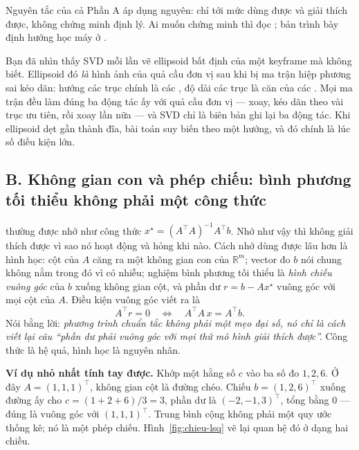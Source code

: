 \documentclass[../../../deep_learning.tex]{subfiles}
\begin{document}
Nguyên tắc của cả Phần A áp dụng nguyên: chỉ tới mức dùng được và giải thích được, không chứng minh định lý. Ai muốn chứng minh thì đọc \cite{trefethen1997}; bản trình bày định hướng học máy ở \cite{deisenroth2020}.

\begin{trucgiac}
Bạn đã nhìn thấy SVD mỗi lần vẽ ellipsoid bất định của một keyframe mà không biết. Ellipsoid đó \emph{là} hình ảnh của quả cầu đơn vị sau khi bị ma trận hiệp phương sai kéo dãn: hướng các trục chính là các , độ dài các trục là căn của các . Mọi ma trận đều làm đúng ba động tác ấy với quả cầu đơn vị --- xoay, kéo dãn theo vài trục ưu tiên, rồi xoay lần nữa --- và SVD chỉ là biên bản ghi lại ba động tác. Khi ellipsoid dẹt gần thành đĩa, bài toán suy biến theo một hướng, và đó chính là lúc số điều kiện lớn.
\end{trucgiac}

\subsection{B. Không gian con và phép chiếu: bình phương tối thiểu không phải một công thức}
 thường được nhớ như công thức \(x^\star = (A^\top A)^{-1}A^\top b\). Nhớ như vậy thì không giải thích được vì sao nó hoạt động và hỏng khi nào. Cách nhớ dùng được lâu hơn là hình học: cột của \(A\) căng ra một không gian con của \(\mathbb{R}^m\); vector đo \(b\) nói chung không nằm trong đó vì có nhiễu; nghiệm bình phương tối thiểu là \emph{hình chiếu vuông góc} của \(b\) xuống không gian cột, và phần dư \(r = b - Ax^\star\) vuông góc với mọi cột của \(A\). Điều kiện vuông góc viết ra là
\[
A^\top r = 0 \quad\Longleftrightarrow\quad A^\top A\,x = A^\top b .
\]
Nói bằng lời: \emph{phương trình chuẩn tắc không phải một mẹo đại số, nó chỉ là cách viết lại câu ``phần dư phải vuông góc với mọi thứ mô hình giải thích được''.} Công thức là hệ quả, hình học là nguyên nhân.

\textbf{Ví dụ nhỏ nhất tính tay được.} Khớp một hằng số \(c\) vào ba số đo \(1, 2, 6\). Ở đây \(A = (1,1,1)^\top\), không gian cột là đường chéo. Chiếu \(b=(1,2,6)^\top\) xuống đường ấy cho \(c = (1+2+6)/3 = 3\), phần dư là \((-2,-1,3)^\top\), tổng bằng \(0\) --- đúng là vuông góc với \((1,1,1)^\top\). Trung bình cộng không phải một quy ước thống kê; nó là một phép chiếu. Hình~\ref{fig:chieu-lsq} vẽ lại quan hệ đó ở dạng hai chiều.
\end{document}
